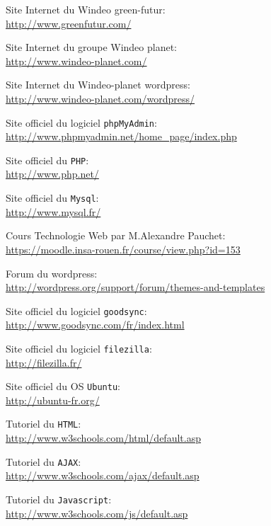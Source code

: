 \documentclass[a4paper,french,12pt]{report}
\begin{document}
\begin{thebibliography}{9}
                Site Internet du Windeo green-futur:\\
		\url{http://www.greenfutur.com/}

                Site Internet du groupe Windeo planet:\\
		\url{http://www.windeo-planet.com/}

                Site Internet du Windeo-planet wordpress:\\
		\url{http://www.windeo-planet.com/wordpress/}

                Site officiel du logiciel \texttt{phpMyAdmin}:\\
		\url{http://www.phpmyadmin.net/home\_page/index.php}

                Site officiel du \texttt{PHP}:\\
		\url{http://www.php.net/}

                Site officiel du \texttt{Mysql}:\\
		\url{http://www.mysql.fr/}

                Cours Technologie Web par M.Alexandre Pauchet:\\
		\url{https://moodle.insa-rouen.fr/course/view.php?id=153}

                Forum du wordpress:\\
		\url{http://wordpress.org/support/forum/themes-and-templates}

                Site officiel du logiciel \texttt{goodsync}:\\
		\url{http://www.goodsync.com/fr/index.html}

                Site officiel du logiciel \texttt{filezilla}:\\
		\url{http://filezilla.fr/}

                Site officiel du OS \texttt{Ubuntu}:\\
		\url{http://ubuntu-fr.org/}

                Tutoriel du \texttt{HTML}:\\
		\url{http://www.w3schools.com/html/default.asp}

                Tutoriel du \texttt{AJAX}:\\
		\url{http://www.w3schools.com/ajax/default.asp}

                Tutoriel du \texttt{Javascript}:\\
		\url{http://www.w3schools.com/js/default.asp}


\end{thebibliography}
\end{document}
